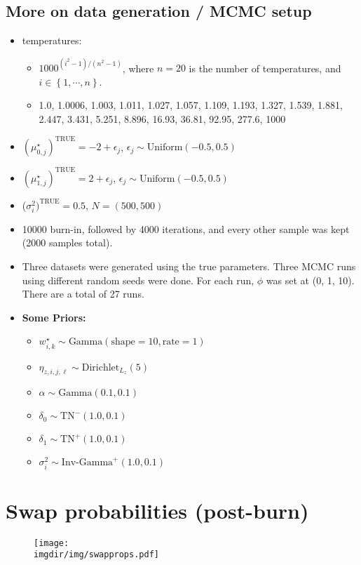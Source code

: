 \documentclass[10pt]{article} %
\newcommand{\bc}[1]{ \left\{#1\right\} }
\newcommand{\Gam}{ \text{Gamma} }
\newcommand{\InvGamma}{ \text{Inv-Gamma} }
\newcommand{\Uniform}{ \text{Uniform} }
\def\Dir{\text{Dirichlet}}
\def\TN{\text{TN}}
\def\true{\text{TRUE}}
\def\imgdir{../../results/test-sim-6-7/maxtemp1000-ntempts20-degree4-N500}
\begin{document}
\subsection{More on data generation / MCMC setup}
\begin{itemize}
  \item temperatures: 
    \begin{itemize}
      \item $1000^{(i^2 - 1) / (n^2 - 1)}$, where $n=20$ is the number of
        temperatures, and $i\in\bc{1,\cdots,n}$.
      \item 1.0, 1.0006, 1.003, 1.011,
        1.027, 1.057, 1.109,
        1.193, 1.327, 1.539,
        1.881, 2.447, 3.431,
        5.251, 8.896, 16.93,
        36.81, 92.95, 277.6, 1000
    \end{itemize}
  \item $(\mu_{0,j}^\star)^\true=-2 + \epsilon_j$, $\epsilon_j \sim \Uniform(-0.5, 0.5)$
  \item $(\mu_{1,j}^\star)^\true=2 + \epsilon_j$, $\epsilon_j \sim \Uniform(-0.5, 0.5)$
  \item ($\sigma^2_i)^\true=0.5$, $N=(500, 500)$
  \item 10000 burn-in, followed by 4000 iterations, and every other sample was
    kept (2000 samples total).
  \item Three datasets were generated using the true parameters. Three MCMC runs using 
    different random seeds were done. For each run, $\phi$ was set at (0, 1, 10). There
    are a total of 27 runs.
  \item \textbf{Some Priors:}
  \begin{itemize}
    \item $w^\star_{i,k} \sim \Gam(\text{shape}=10, \text{rate}=1)$
    \item $\eta_{z, i,j,\ell} \sim \Dir_{L_z}(5)$
    \item $\alpha \sim \Gam(0.1, 0.1)$
    \item $\delta_0 \sim \TN^-(1.0, 0.1)$
    \item $\delta_1 \sim \TN^+(1.0, 0.1)$
    \item $\sigma^2_i \sim \InvGamma^+(1.0, 0.1)$
  \end{itemize}
\end{itemize}

\newpage
\section{Swap probabilities (post-burn)}
\begin{figure}[H]
  \centering
  \texttt{[image: \\imgdir/img/swapprops.pdf]}
\end{figure}
\end{document}
